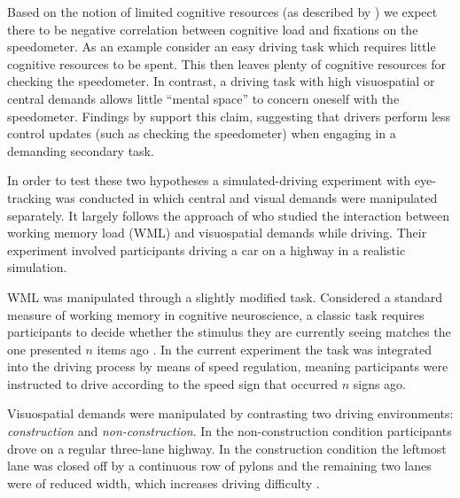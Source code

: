 Based on the notion of limited cognitive resources (as described by \citet{DeWaard1996}) we expect there to be negative correlation between cognitive load and fixations on the speedometer.
As an example consider an easy driving task which requires little cognitive resources to be spent.
This then leaves plenty of cognitive resources for checking the speedometer.
In contrast, a driving task with high visuospatial or central demands allows little ``mental space'' to concern oneself with the speedometer.
Findings by \citet{Salvucci2011} support this claim, suggesting that drivers perform less control updates (such as checking the speedometer) when engaging in a demanding secondary task.

In order to test these two hypotheses a simulated-driving experiment with eye-tracking was conducted in which central and visual demands were manipulated separately.
It largely follows the approach of \citet{Scheunemann2019} who studied the interaction between working memory load (WML) and visuospatial demands while driving.
Their experiment involved participants driving a car on a highway in a realistic simulation. 

WML was manipulated through a slightly modified \nback task. 
Considered a standard measure of working memory in cognitive neuroscience, a classic \nback task requires participants to decide whether the stimulus they are currently seeing matches the one presented \(n\) items ago \citep{Kane2007}.
In the current experiment the task was integrated into the driving process by means of speed regulation, meaning participants were instructed to drive according to the speed sign that occurred \(n\) signs ago.

Visuospatial demands were manipulated by contrasting two driving environments: \textit{construction} and \textit{non-construction}.
In the non-construction condition participants drove on a regular three-lane highway.
In the construction condition the leftmost lane was closed off by a continuous row of pylons and the remaining two lanes were of reduced width, which increases driving difficulty \citep{Liu2016}.